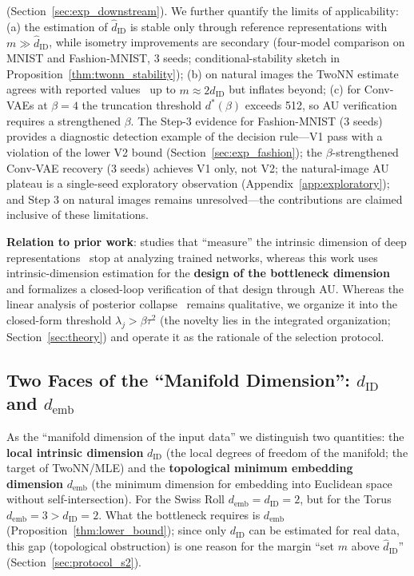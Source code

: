 \documentclass[make,article,submit,pdftex,moreauthors]{Definitions/mdpi}
\newcommand{\dID}{d_{\mathrm{ID}}}
\newcommand{\hatdID}{\hat{d}_{\mathrm{ID}}}
\newcommand{\demb}{d_{\mathrm{emb}}}
\newcommand{\dstar}{d^{*}(\beta)}
\begin{document}
\begin{enumerate}
        (Section~\ref{sec:exp_downstream}).
        We further quantify the limits of applicability:
        (a) the estimation of $\hatdID$ is stable only through reference
        representations with $m \gg \hatdID$, while isometry improvements
        are secondary (four-model comparison on MNIST and Fashion-MNIST,
        3 seeds; conditional-stability sketch in
        Proposition~\ref{thm:twonn_stability});
        (b) on natural images the TwoNN estimate agrees with reported
        values~\cite{pope2021intrinsic} up to $m \approx 2\hatdID$ but
        inflates beyond;
        (c) for Conv-VAEs at $\beta = 4$ the truncation threshold $\dstar$
        exceeds 512, so AU verification requires a strengthened $\beta$.
        The Step-3 evidence for Fashion-MNIST (3 seeds) provides a
        diagnostic detection example of the decision rule---V1 pass with a
        violation of the lower V2 bound (Section~\ref{sec:exp_fashion});
        the $\beta$-strengthened Conv-VAE recovery (3 seeds) achieves V1
        only, not V2; the natural-image AU plateau is a single-seed
        exploratory observation (Appendix~\ref{app:exploratory}); and
        Step 3 on natural images remains unresolved---the contributions are
        claimed inclusive of these limitations.
\end{enumerate}

\textbf{Relation to prior work}:
studies that ``measure'' the intrinsic dimension of deep
representations~\cite{ansuini2019intrinsic,pope2021intrinsic,valeriani2023geometry}
stop at analyzing trained networks, whereas this work uses
intrinsic-dimension estimation for the \textbf{design of the bottleneck
dimension} and formalizes a closed-loop verification of that design through
AU.
Whereas the linear analysis of posterior collapse~\cite{lucas2019elbo}
remains qualitative, we organize it into the closed-form threshold
$\lambda_j > \beta\tau^2$ (the novelty lies in the integrated organization;
Section~\ref{sec:theory}) and operate it as the rationale of the selection
protocol.

\subsection{Two Faces of the ``Manifold Dimension'': $\dID$ and $\demb$}\label{sec:intro_dim}

As the ``manifold dimension of the input data'' we distinguish two
quantities:
the \textbf{local intrinsic dimension} $\dID$ (the local degrees of freedom
of the manifold; the target of TwoNN/MLE) and the
\textbf{topological minimum embedding dimension} $\demb$ (the minimum
dimension for embedding into Euclidean space without self-intersection).
For the Swiss Roll $\demb = \dID = 2$, but for the Torus
$\demb = 3 > \dID = 2$.
What the bottleneck requires is $\demb$
(Proposition~\ref{thm:lower_bound}); since only $\dID$ can be estimated for
real data, this gap (topological obstruction) is one reason for the margin
``set $m$ above $\hatdID$'' (Section~\ref{sec:protocol_s2}).
\end{document}
